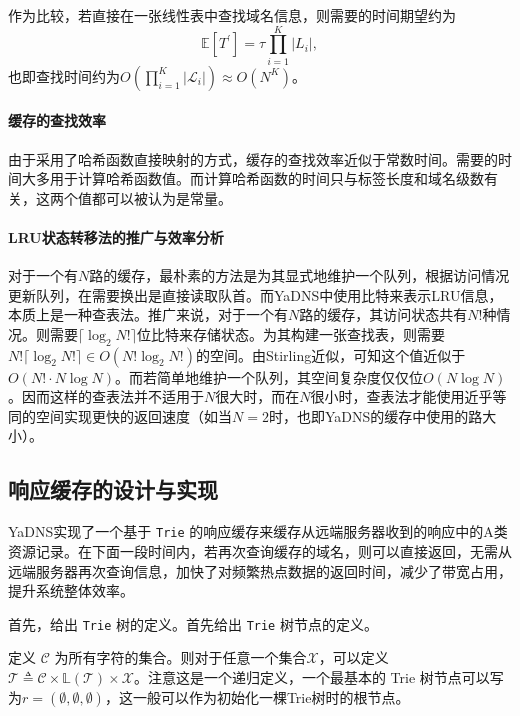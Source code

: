 作为比较，若直接在一张线性表中查找域名信息，则需要的时间期望约为
\begin{equation}
  \mathds E[T^\prime] = \tau \prod_{i = 1}^K | L_i |,
\end{equation}
也即查找时间约为$O(\prod_{i=1}^K | \mathcal L_i |) \approx O(N^K)$。

\paragraph{缓存的查找效率}

由于采用了哈希函数直接映射的方式，缓存的查找效率近似于常数时间。需要的时间大多用于计算哈希函数值。而计算哈希函数的时间只与标签长度和域名级数有关，这两个值都可以被认为是常量。

\paragraph{LRU状态转移法的推广与效率分析}

对于一个有$N$路的缓存，最朴素的方法是为其显式地维护一个队列，根据访问情况更新队列，在需要换出是直接读取队首。而YaDNS中使用比特来表示LRU信息，本质上是一种查表法。推广来说，对于一个有$N$路的缓存，其访问状态共有$N!$种情况。则需要$\lceil \log_2 N! \rceil$位比特来存储状态。为其构建一张查找表，则需要$N! \lceil \log_2 N! \rceil \in O(N! \log_2 N!)$的空间。由Stirling近似，可知这个值近似于$O(N! \cdot N \log N)$。而若简单地维护一个队列，其空间复杂度仅仅位$O(N \log N)$。因而这样的查表法并不适用于$N$很大时，而在$N$很小时，查表法才能使用近乎等同的空间实现更快的返回速度（如当$N = 2$时，也即YaDNS的缓存中使用的路大小）。

\subsection{响应缓存的设计与实现}

YaDNS实现了一个基于 \lstinline{Trie} 的响应缓存来缓存从远端服务器收到的响应中的A类资源记录。在下面一段时间内，若再次查询缓存的域名，则可以直接返回，无需从远端服务器再次查询信息，加快了对频繁热点数据的返回时间，减少了带宽占用，提升系统整体效率。

首先，给出 \lstinline{Trie} 树的定义。首先给出 \lstinline{Trie} 树节点的定义。

\begin{definition}[Trie树节点]
  定义 $\mathcal C$ 为所有字符的集合。则对于任意一个集合$\mathcal X$，可以定义$\mathcal T \triangleq \mathcal C \times \mathds L(\mathcal T) \times \mathcal X$。注意这是一个递归定义，一个最基本的 Trie 树节点可以写为$r = (\emptyset, \emptyset, \emptyset)$，这一般可以作为初始化一棵Trie树时的根节点。
\end{definition}

